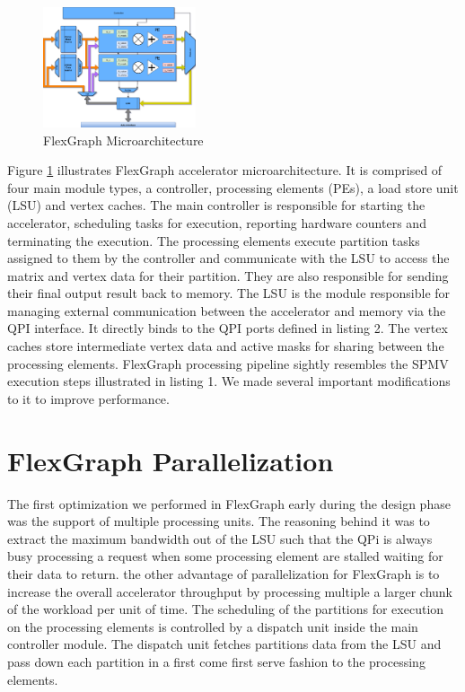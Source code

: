 \begin{figure}[htbp]
\centering
\includegraphics[width=0.4\textwidth]{figures/microarchitecture}
\caption{FlexGraph Microarchitecture}
\label{fig:microarchitecture}
\end{figure}

Figure \ref{fig:microarchitecture} illustrates FlexGraph accelerator microarchitecture. It is comprised of four main module types, a controller, processing elements (PEs), a load store unit (LSU) and vertex caches. The main controller is responsible for starting the accelerator, scheduling tasks for execution, reporting hardware counters and terminating the execution. The processing elements execute partition tasks assigned to them by the controller and communicate with the LSU to access the matrix and vertex data for their partition. They are also responsible for sending their final output result back to memory. The LSU is the module responsible for managing external communication between the accelerator and memory via the QPI interface. It directly binds to the QPI ports defined in listing 2.
The vertex caches store intermediate vertex data and active masks for sharing between the processing elements. FlexGraph processing pipeline sightly resembles the SPMV execution steps illustrated in listing 1. We made several important modifications to it to improve performance.  

\section{FlexGraph Parallelization}

The first optimization we performed in FlexGraph early during the design phase was the support of multiple processing units. The reasoning behind it was to extract the maximum bandwidth out of the LSU such that the QPi is always busy processing a request when some processing element are stalled waiting for their data to return. the other advantage of parallelization for FlexGraph is to increase the overall accelerator throughput by processing multiple a larger chunk of the workload per unit of time. The scheduling of the partitions for execution on the processing elements is controlled by a dispatch unit inside the main controller module. The dispatch unit fetches partitions data from the LSU and pass down each partition in a first come first serve fashion to the processing elements.

